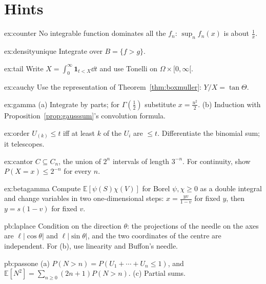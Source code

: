 \section{Hints}

\begin{hint}{ex:counter}
No integrable function dominates all the $f_n$: $\sup_nf_n(x)$ is about $\frac1x$.
\end{hint}
\begin{hint}{ex:densityunique}
Integrate over $B=\{f>g\}$.
\end{hint}
\begin{hint}{ex:tail}
Write $X=\int_0^\infty\mathbf 1_{t<X}\dd t$ and use Tonelli on $\Omega\times[0,\infty[$.
\end{hint}
\begin{hint}{ex:cauchy}
Use the representation of Theorem~\ref{thm:boxmuller}: $Y/X=\tan\Theta$.
\end{hint}
\begin{hint}{ex:gamma}
(a) Integrate by parts; for $\Gamma(\frac12)$ substitute $x=\frac{u^2}2$. (b) Induction with Proposition~\ref{prop:gausssum}'s convolution formula.
\end{hint}
\begin{hint}{ex:order}
$U_{(k)}\le t$ iff at least $k$ of the $U_i$ are $\le t$. Differentiate the binomial sum; it telescopes.
\end{hint}
\begin{hint}{ex:cantor}
$C\subseteq C_n$, the union of $2^n$ intervals of length $3^{-n}$. For continuity, show $P(X=x)\le2^{-n}$ for every $n$.
\end{hint}
\begin{hint}{ex:betagamma}
Compute $\mathbb E[\psi(S)\chi(V)]$ for Borel $\psi,\chi\ge0$ as a double integral and change variables in two one-dimensional steps:
$x=\frac{yv}{1-v}$ for fixed $y$, then $y=s(1-v)$ for fixed $v$.
\end{hint}

\begin{hint}{pb:laplace}
Condition on the direction $\theta$: the projections of the needle on the axes are $\ell|\cos\theta|$ and $\ell|\sin\theta|$,
and the two coordinates of the centre are independent. For (b), use linearity and Buffon's needle.
\end{hint}

\begin{hint}{pb:passone}
(a) $P(N>n)=P(U_1+\cdots+U_n\le1)$, and $\mathbb E[N^2]=\sum_{n\ge0}(2n+1)P(N>n)$. (c) Partial sums.
\end{hint}

